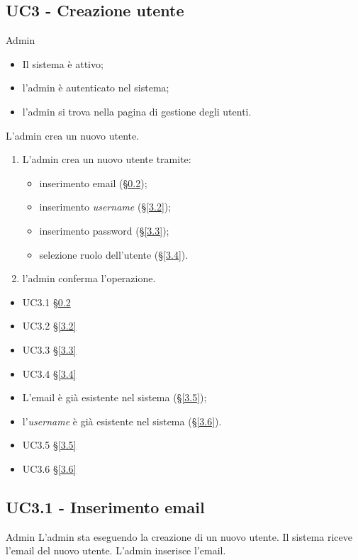 \subsection{UC3 - Creazione utente}
\label{3}
{Admin}
{   \begin{itemize}
        \item Il sistema è attivo;
        \item l'admin è autenticato nel sistema;
        \item l'admin si trova nella pagina di gestione degli utenti.
    \end{itemize}
}
{L'admin crea un nuovo utente.}
{   \begin{enumerate}
        \item L'admin crea un nuovo utente tramite:
            \begin{itemize}
                \item inserimento email (§\ref{3.1});
                \item inserimento \textit{username} (§\ref{3.2});
                \item inserimento password (§\ref{3.3});
                \item selezione ruolo dell'utente (§\ref{3.4}).
            \end{itemize}
        \item l'admin conferma l'operazione.
    \end{enumerate}
}
{   \begin{itemize}
        \item UC3.1 §\ref{3.1}
        \item UC3.2 §\ref{3.2}
        \item UC3.3 §\ref{3.3}
        \item UC3.4 §\ref{3.4}
    \end{itemize} 
}
{
    \begin{itemize}
        \item L'email è già esistente nel sistema (§\ref{3.5});
        \item l'\textit{username} è già esistente nel sistema (§\ref{3.6}).
    \end{itemize}
}
{
    \begin{itemize}
        \item UC3.5 §\ref{3.5}
        \item UC3.6 §\ref{3.6}
    \end{itemize}
}{}

\subsection{UC3.1 - Inserimento email}
\label{3.1}
\makeUC{}
{Admin}
{L'admin sta eseguendo la creazione di un nuovo utente.}
{Il sistema riceve l'email del nuovo utente.}
{L'admin inserisce l'email.}{}{}{}{}

